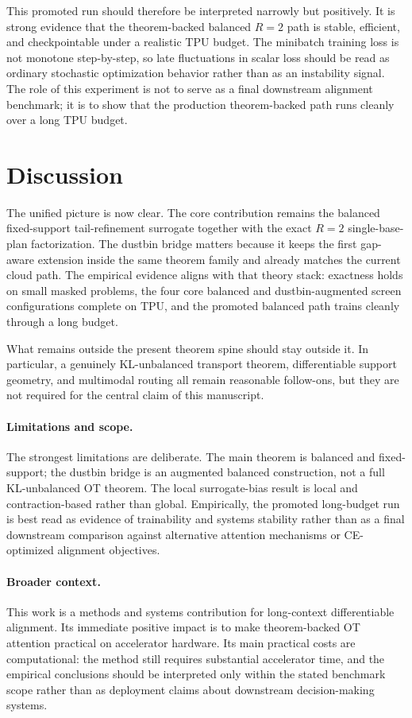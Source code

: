 This promoted run should therefore be interpreted narrowly but positively. It is strong evidence that the theorem-backed balanced $R=2$ path is stable, efficient, and checkpointable under a realistic TPU budget. The minibatch training loss is not monotone step-by-step, so late fluctuations in scalar loss should be read as ordinary stochastic optimization behavior rather than as an instability signal. The role of this experiment is not to serve as a final downstream alignment benchmark; it is to show that the production theorem-backed path runs cleanly over a long TPU budget.

\section{Discussion}

The unified picture is now clear. The core contribution remains the balanced fixed-support tail-refinement surrogate together with the exact $R=2$ single-base-plan factorization. The dustbin bridge matters because it keeps the first gap-aware extension inside the same theorem family and already matches the current cloud path. The empirical evidence aligns with that theory stack: exactness holds on small masked problems, the four core balanced and dustbin-augmented screen configurations complete on TPU, and the promoted balanced path trains cleanly through a long budget.

What remains outside the present theorem spine should stay outside it. In particular, a genuinely KL-unbalanced transport theorem, differentiable support geometry, and multimodal routing all remain reasonable follow-ons, but they are not required for the central claim of this manuscript.

\paragraph{Limitations and scope.}
The strongest limitations are deliberate. The main theorem is balanced and fixed-support; the dustbin bridge is an augmented balanced construction, not a full KL-unbalanced OT theorem. The local surrogate-bias result is local and contraction-based rather than global. Empirically, the promoted long-budget run is best read as evidence of trainability and systems stability rather than as a final downstream comparison against alternative attention mechanisms or CE-optimized alignment objectives.

\paragraph{Broader context.}
This work is a methods and systems contribution for long-context differentiable alignment. Its immediate positive impact is to make theorem-backed OT attention practical on accelerator hardware. Its main practical costs are computational: the method still requires substantial accelerator time, and the empirical conclusions should be interpreted only within the stated benchmark scope rather than as deployment claims about downstream decision-making systems.

